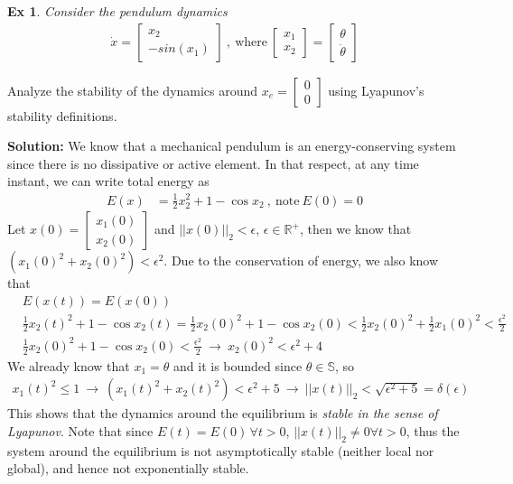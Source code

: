 \documentclass[twoside]{article}
\newtheorem{exmp}[theorem]{Ex}
\begin{document}
\begin{exmp}
    Consider the pendulum dynamics
    \begin{align*}
    \dot{x} = \begin{bmatrix} x_2 \\ -sin(x_1)\end{bmatrix} \ , \ \mathrm{where} \ \begin{bmatrix} x_1 \\ x_2 \end{bmatrix} = \begin{bmatrix}  \theta \\ \dot{\theta} \end{bmatrix}
\end{align*}
\end{exmp}
Analyze the stability of the dynamics around $x_e = \begin{bmatrix} 0 \\ 0 \end{bmatrix}$ using Lyapunov's stability definitions.

\textbf{Solution:} We know that a mechanical pendulum is an
energy-conserving system since there is no dissipative or active element. In that respect, at any time instant, we can write total energy as 
%
\begin{align*}
E(x) &= \frac{1}{2} x_2^2 + 1 - \cos{x_2}  \ , \ \mathrm{note} \ E(0) = 0
\end{align*}
%
Let $x(0) = \begin{bmatrix} x_1(0) \\ x_2(0) \end{bmatrix}$ and $|| x(0) ||_2 < \epsilon , \, \epsilon \in \mathbb{R}^+ $, then we know that $ (x_1(0)^2 + x_2(0)^2) < \epsilon^2 $. Due to the conservation of energy, we also know that
%
\begin{align*}
&E(x(t)) = E(x(0)) \\
&\frac{1}{2} x_2(t)^2 + 1 - \cos{x_2(t)} 
= 
\frac{1}{2} x_2(0)^2 + 1 - \cos{x_2(0)} < \frac{1}{2} x_2(0)^2 + \frac{1}{2} x_1(0)^2 < \frac{\epsilon^2}{2}
\\
&\frac{1}{2} x_2(0)^2 + 1 - \cos{x_2(0)} < \frac{\epsilon^2}{2} 
\ \rightarrow \ x_2(0)^2 < \epsilon^2 + 4
\end{align*}
%
We already know that $x_1 = \theta$ and it is bounded since $\theta \in \mathbb{S}$, so 
%
\begin{align*}
x_1(t)^2 \leq 1 \ \rightarrow \ ( x_1(t)^2 + x_2(t)^2 ) < \epsilon^2 + 5 \ \rightarrow \ || x(t) ||_2 < \sqrt{\epsilon^2 + 5} = \delta(\epsilon)
\end{align*}
%
This shows that the dynamics around the equilibrium is \textit{stable in the sense of Lyapunov}. Note that 
since $E(t) = E(0) \, \forall t >0$, $|| x(t) ||_2 \neq 0 \forall t >0$, thus the system around the equilibrium is not asymptotically stable (neither local nor global), and hence not exponentially stable. 
\end{document}
